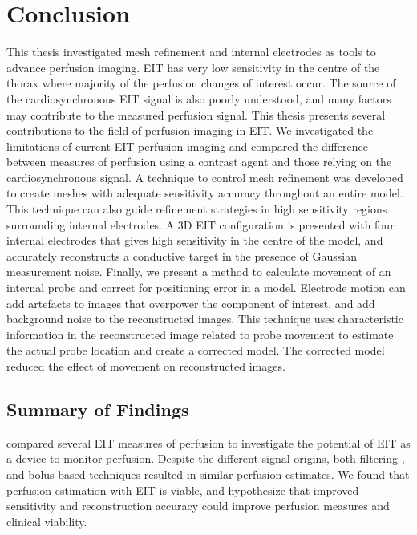 \chapter{Conclusion}

This thesis investigated mesh refinement and internal electrodes 
as tools to advance perfusion imaging. 
EIT has very low sensitivity in the centre of the thorax where 
majority of the perfusion changes of interest occur. 
The source of the cardiosynchronous EIT signal is also 
poorly understood, and many factors may contribute to 
the measured perfusion signal. 
This thesis presents several contributions to the field of 
perfusion imaging in EIT.
We investigated the limitations of current EIT perfusion imaging
and compared the difference between measures of perfusion using 
a contrast agent and those relying on the cardiosynchronous signal.
A technique to control mesh refinement was developed to create meshes
with adequate sensitivity accuracy throughout an entire model. This 
technique can also guide refinement strategies in high sensitivity regions  
surrounding internal electrodes. 
A 3D EIT configuration is presented with four internal electrodes that gives high
sensitivity in the centre of the model, and accurately reconstructs a conductive
target in the presence of Gaussian measurement noise.
Finally, we present a method to calculate movement of 
an internal probe and correct for positioning error in a model. Electrode 
motion can add artefacts
to images that overpower the 
component of interest, and add background noise to the reconstructed images. 
This technique uses characteristic information in the reconstructed 
image related to probe movement to estimate the actual probe location 
and create a corrected model. The corrected model 
reduced the effect of movement on reconstructed images. 

\section{Summary of Findings}

 compared several EIT measures of perfusion 
to investigate the potential of EIT as a device to monitor 
perfusion. 
Despite the different signal origins, both filtering-, and bolus-based 
techniques 
resulted in similar perfusion estimates. We found that perfusion 
estimation with EIT is viable, and hypothesize that 
improved sensitivity and reconstruction accuracy could improve perfusion 
measures and clinical viability. 

